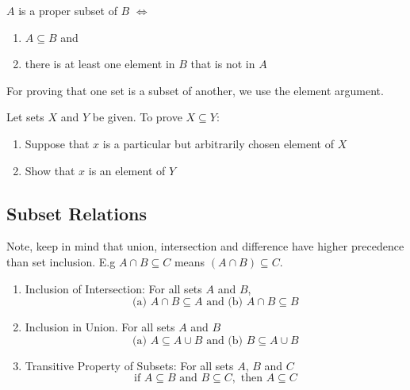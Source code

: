 \documentclass[11pt]{article}
\begin{document}
\begin{definition}\label{def:proper-subset}
    $A$ is a proper subset of $B$ $\iff$
    \begin{enumerate}
        \item $A \subseteq B$ and
        \item there is at least one element in $B$ that is not in $A$
    \end{enumerate}
\end{definition}

\begin{definition}\label{def:element-argument}
    For proving that one set is a subset of another, we use the element argument.

    Let sets $X$ and $Y$ be given. To prove $X \subseteq Y$:
    \begin{enumerate}
        \item Suppose that $x$ is a particular but arbitrarily chosen element of $X$
        \item Show that $x$ is an element of $Y$
    \end{enumerate}
\end{definition}

\subsection{Subset Relations}

\begin{definition}\label{def:subset-relations}
    Note, keep in mind that union, intersection and difference have higher precedence
    than set inclusion. E.g $A \cap B \subseteq C$ means $(A \cap B) \subseteq C$.

    \begin{enumerate}
        \item Inclusion of Intersection: For all sets $A$ and $B$,
            \begin{equation*}
                \text{(a) } A \cap B \subseteq A \text{ and (b) } A \cap B \subseteq B
            \end{equation*}
        \item Inclusion in Union. For all sets $A$ and $B$
            \begin{equation*}
                \text{(a) } A \subseteq A \cup B \text{ and (b) } B \subseteq A \cup B
            \end{equation*}
        \item Transitive Property of Subsets: For all sets $A$, $B$ and $C$
            \begin{equation*}
                \text{if } A \subseteq B \text{ and } B \subseteq C, \text{ then } A \subseteq C
            \end{equation*}
    \end{enumerate}
\end{definition}
\end{document}
